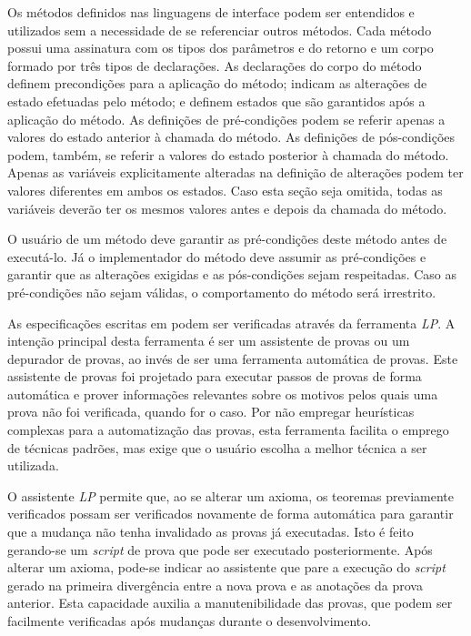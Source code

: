 Os métodos definidos nas linguagens de interface podem ser entendidos e utilizados sem a necessidade de se referenciar outros métodos.
Cada método possui uma assinatura com os tipos dos parâmetros e do retorno e um corpo formado por três tipos de declarações.
As declarações do corpo do método definem precondições para a aplicação do método; indicam as alterações de estado efetuadas pelo método; e definem estados que são garantidos após a aplicação do método.
As definições de pré-condições podem se referir apenas a valores do estado anterior à chamada do método.
As definições de pós-condições podem, também, se referir a valores do estado posterior à chamada do método.
Apenas as variáveis explicitamente alteradas na definição de alterações podem ter valores diferentes em ambos os estados.
Caso esta seção seja omitida, todas as variáveis deverão ter os mesmos valores antes e depois da chamada do método.

O usuário de um método deve garantir as pré-condições deste método antes de executá-lo.
Já o implementador do método deve assumir as pré-condições e garantir que as alterações exigidas e as pós-condições sejam respeitadas.
Caso as pré-condições não sejam válidas, o comportamento do método será irrestrito.

As especificações escritas em \Larch podem ser verificadas através da ferramenta \textit{LP}.
A intenção principal desta ferramenta é ser um assistente de provas ou um depurador de provas, ao invés de ser uma ferramenta automática de provas.
Este assistente de provas foi projetado para executar passos de provas de forma automática e prover informações relevantes sobre os motivos pelos quais uma prova não foi verificada, quando for o caso.
Por não empregar heurísticas complexas para a automatização das provas, esta ferramenta facilita o emprego de técnicas padrões, mas exige que o usuário escolha a melhor 
técnica a ser utilizada.

O assistente \textit{LP} permite que, ao se alterar um axioma, os teoremas previamente verificados possam ser verificados novamente de forma automática para garantir que a mudança não tenha invalidado as provas já executadas.
Isto é feito gerando-se um \textit{script} de prova que pode ser executado posteriormente.
Após alterar um axioma, pode-se indicar ao assistente que pare a execução do \textit{script} gerado na primeira divergência entre a nova prova e as anotações da prova anterior.
Esta capacidade auxilia a manutenibilidade das provas, que podem ser facilmente verificadas após mudanças durante o desenvolvimento.

